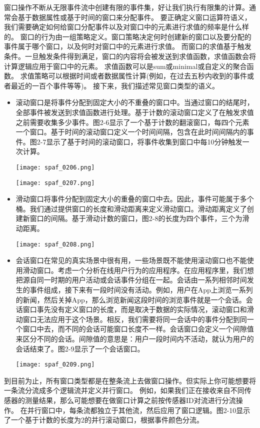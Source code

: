 \documentclass[oneside]{ctexbook}
\begin{document}
窗口操作不断从无限事件流中创建有限的事件集，好让我们执行有限集的计算。通常会基于数据属性或基于时间的窗口来分配事件。
要正确定义窗口运算符语义，我们需要确定如何给窗口分配事件以及对窗口中的元素进行求值的频率是什么样的。
窗口的行为由一组策略定义。窗口策略决定何时创建新的窗口以及要分配的事件属于哪个窗口，以及何时对窗口中的元素进行求值。
而窗口的求值基于触发条件。一旦触发条件得到满足，窗口的内容将会被发送到求值函数，求值函数会将计算逻辑应用于窗口中的元素。
求值函数可以是sum或minimal或自定义的聚合函数。
求值策略可以根据时间或者数据属性计算(例如，在过去五秒内收到的事件或者最近的一百个事件等等)。
接下来，我们描述常见窗口类型的语义。

\begin{itemize}
  \item 滚动窗口是将事件分配到固定大小的不重叠的窗口中。当通过窗口的结尾时，全部事件被发送到求值函数进行处理。基于计数的滚动窗口定义了在触发求值之前需要收集多少事件。图2-6显示了一个基于计数的翻滚窗口，每四个元素一个窗口。基于时间的滚动窗口定义一个时间间隔，包含在此时间间隔内的事件。图2-7显示了基于时间的滚动窗口，将事件收集到窗口中每10分钟触发一次计算。

  \texttt{[image: spaf\_0206.png]}

  \texttt{[image: spaf\_0207.png]}

  \item 滑动窗口将事件分配到固定大小的重叠的窗口中去。因此，事件可能属于多个桶。我们通过提供窗口的长度和滑动距离来定义滑动窗口。滑动距离定义了创建新窗口的间隔。基于滑动计数的窗口，图2-8的长度为四个事件，三个为滑动距离。

  \texttt{[image: spaf\_0208.png]}

  \item 会话窗口在常见的真实场景中很有用，一些场景既不能使用滚动窗口也不能使用滑动窗口。考虑一个分析在线用户行为的应用程序。在应用程序里，我们想把源自同一时期的用户活动或会话事件分组在一起。会话由一系列相邻时间发生的事件组成，接下来有一段时间没有活动。例如，用户在App上浏览一系列的新闻，然后关掉App，那么浏览新闻这段时间的浏览事件就是一个会话。会话窗口事先没有定义窗口的长度，而是取决于数据的实际情况，滚动窗口和滑动窗口无法应用于这个场景。相反，我们需要将同一会话中的事件分配到同一个窗口中去，而不同的会话可能窗口长度不一样。会话窗口会定义一个间隙值来区分不同的会话。间隙值的意思是：用户一段时间内不活动，就认为用户的会话结束了。图2-9显示了一个会话窗口。

  \texttt{[image: spaf\_0209.png]}

\end{itemize}

到目前为止，所有窗口类型都是在整条流上去做窗口操作。但实际上你可能想要将一条流分流成多个逻辑流并定义并行窗口。
例如，如果我们正在接收来自不同传感器的测量结果，那么可能想要在做窗口计算之前按传感器ID对流进行分流操作。
在并行窗口中，每条流都独立于其他流，然后应用了窗口逻辑。图2-10显示了一个基于计数的长度为2的并行滚动窗口，根据事件颜色分流。
\end{document}
